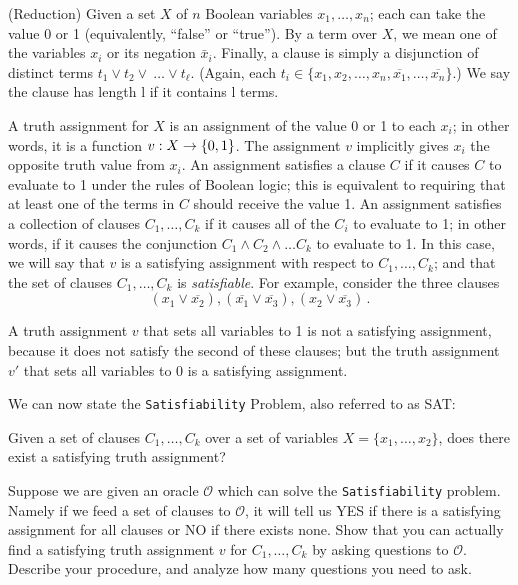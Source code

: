 \begin{questions}
\question (Reduction) Given a set $X$ of $n$ Boolean variables
  $x_1,\ldots,x_n$; each can take the value 0 or 1 (equivalently,
  ``false'' or ``true''). By a term over $X$, we mean one of the
  variables $x_i$ or its negation $\bar x_i$. Finally, a clause is
  simply a disjunction of distinct terms
  $t_1 \vee t_2 \vee \ \ldots \vee t_\ell $.  (Again, each
  $t_i \in \{x_1, x_2,\ldots,x_n, \overline{x_1},\ldots,
  \overline{x_n}\}$.) We say the clause has length l if it contains l
  terms.

  A truth assignment for $X$ is an assignment of the value 0 or 1 to
  each $x_i$; in other words, it is a function $v: X \to \{0,1\}$. The
  assignment $v$ implicitly gives $x_i$ the opposite truth value from
  $x_i$. An assignment satisfies a clause $C$ if it causes $C$ to
  evaluate to 1 under the rules of Boolean logic; this is equivalent
  to requiring that at least one of the terms in $C$ should receive
  the value 1. An assignment satisfies a collection of clauses
  $C_1,\ldots, C_k$ if it causes all of the $C_i$ to evaluate to 1; in
  other words, if it causes the conjunction
  $C_1 \wedge C_2 \wedge \ldots C_k$ to evaluate to 1. In this case,
  we will say that $v$ is a satisfying assignment with respect to
  $C_1,\ldots,C_k$; and that the set of clauses $C_1,\ldots,C_k$ is
  \emph{satisfiable}. For example, consider the three clauses
  \[(x_1 \vee \overline{x_2}), (\overline{x_1} \vee \overline{x_3}),
    (x_2 \vee \overline{x_3}) \, .\]

  A truth assignment $v$ that sets all variables to 1 is not a
  satisfying assignment, because it does not satisfy the second of
  these clauses; but the truth assignment $v'$ that sets all variables
  to 0 is a satisfying assignment.

  We can now state the \texttt{Satisfiability} Problem, also referred
  to as SAT:
  \begin{center}
    Given a set of clauses $C_1, \ldots, C_k$ over a set of variables
    $X = \{ x_1, \ldots, x_2\}$, does there exist a satisfying truth
    assignment?
    \end{center}

    Suppose we are given an oracle $\mathcal{O}$ which can solve the
    \texttt{Satisfiability} problem. Namely if we feed a set of
    clauses to $\mathcal{O}$, it will tell us YES if there is a
    satisfying assignment for all clauses or NO if there exists
    none. Show that you can actually find a satisfying truth
    assignment $v$ for $C_1,\ldots,C_k$ by asking questions to
    $\mathcal{O}$. Describe your procedure, and analyze how many
    questions you need to ask.
\end{questions}




